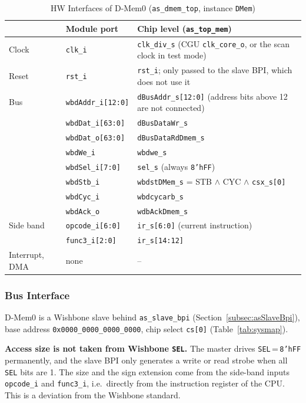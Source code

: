 \begin{table}[H]
\caption{HW Interfaces of D-Mem0 (\texttt{as\_dmem\_top}, instance \texttt{DMem})}
\label{tab:asDmemIf01}
\centering
\begin{tabularx}{\textwidth}{|l |l |X|}
  \hline
   & Module port & Chip level (\texttt{as\_top\_mem}) \\
  \hline
  \hline
  Clock & \texttt{clk\_i} & \texttt{clk\_div\_s} (CGU \texttt{clk\_core\_o}, or the scan clock in test mode) \\
  \hline
  Reset & \texttt{rst\_i} & \texttt{rst\_i}; only passed to the slave BPI, which does not use it \\
  \hline
  Bus & \texttt{wbdAddr\_i[12:0]} & \texttt{dBusAddr\_s[12:0]} (address bits above 12 are not connected) \\
      & \texttt{wbdDat\_i[63:0]}  & \texttt{dBusDataWr\_s} \\
      & \texttt{wbdDat\_o[63:0]}  & \texttt{dBusDataRdDmem\_s} \\
      & \texttt{wbdWe\_i}         & \texttt{wbdwe\_s} \\
      & \texttt{wbdSel\_i[7:0]}   & \texttt{sel\_s} (always \texttt{8'hFF}) \\
      & \texttt{wbdStb\_i}        & \texttt{wbdstDMem\_s} = STB $\wedge$ CYC $\wedge$ \texttt{csx\_s[0]} \\
      & \texttt{wbdCyc\_i}        & \texttt{wbdcycarb\_s} \\
      & \texttt{wbdAck\_o}        & \texttt{wdbAckDmem\_s} \\
  \hline
  Side band & \texttt{opcode\_i[6:0]} & \texttt{ir\_s[6:0]} (current instruction) \\
            & \texttt{func3\_i[2:0]}  & \texttt{ir\_s[14:12]} \\
  \hline
  Interrupt, DMA & none & -- \\
  \hline
\end{tabularx}
\end{table}

\subsubsection{Bus Interface}

D-Mem0 is a Wishbone slave behind \texttt{as\_slave\_bpi}
(Section~\ref{subsec:asSlaveBpi}), base address \texttt{0x0000\_0000\_0000\_0000},
chip select \texttt{cs[0]} (Table~\ref{tab:sysmap}).

\textbf{Access size is not taken from Wishbone \texttt{SEL}.} The master drives
\texttt{SEL}\,=\,\texttt{8'hFF} permanently, and the slave BPI only generates a
write or read strobe when all \texttt{SEL} bits are 1. The size and the
sign extension come from the side-band inputs \texttt{opcode\_i} and
\texttt{func3\_i}, i.e.\ directly from the instruction register of the CPU.
This is a deviation from the Wishbone standard.

